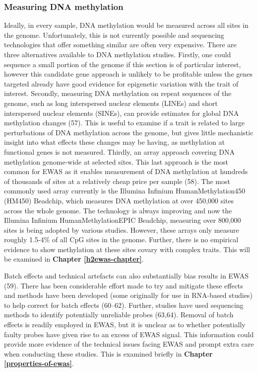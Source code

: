 \documentclass[11pt,twoside]{bristolthesis}
\begin{document}
\hypertarget{measuring-dna-methylation}{%
\subsubsection{Measuring DNA methylation}\label{measuring-dna-methylation}}

Ideally, in every sample, DNA methylation would be measured across all sites in the genome. Unfortunately, this is not currently possible and sequencing technologies that offer something similar are often very expensive. There are three alternatives available to DNA methylation studies. Firstly, one could sequence a small portion of the genome if this section is of particular interest, however this candidate gene approach is unlikely to be profitable unless the genes targeted already have good evidence for epigenetic variation with the trait of interest. Secondly, measuring DNA methylation on repeat sequences of the genome, such as long interspersed nuclear elements (LINEs) and short interspersed nuclear elements (SINEs), can provide estimates for global DNA methylation changes (57). This is useful to examine if a trait is related to large perturbations of DNA methylation across the genome, but gives little mechanistic insight into what effects these changes may be having, as methylation at functional genes is not measured. Thirdly, an array approach covering DNA methylation genome-wide at selected sites. This last approach is the most common for EWAS as it enables measurement of DNA methylation at hundreds of thousands of sites at a relatively cheap price per sample (58). The most commonly used array currently is the Illumina Infinium HumanMethylation450 (HM450) Beadchip, which measures DNA methylation at over 450,000 sites across the whole genome. The technology is always improving and now the Illumina Infinium HumanMethylationEPIC Beadchip, measuring over 800,000 sites is being adopted by various studies. However, these arrays only measure roughly 1.5-4\% of all CpG sites in the genome. Further, there is no empirical evidence to show methylation at these sites covary with complex traits. This will be examined in \textbf{Chapter \ref{h2ewas-chapter}}.

Batch effects and technical artefacts can also substantially bias results in EWAS (59). There has been considerable effort made to try and mitigate these effects and methods have been developed (some originally for use in RNA-based studies) to help correct for batch effects (60--62). Further, studies have used sequencing methods to identify potentially unreliable probes (63,64). Removal of batch effects is readily employed in EWAS, but it is unclear as to whether potentially faulty probes have given rise to an excess of EWAS signal. This information could provide more evidence of the technical issues facing EWAS and prompt extra care when conducting these studies. This is examined briefly in \textbf{Chapter \ref{properties-of-ewas}}.
\end{document}

